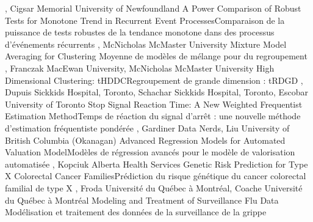 {
,  {Cigsar}
{Memorial University of Newfoundland}
}
{A Power Comparison of Robust Tests for Monotone Trend in Recurrent Event Processes}{Comparaison de la puissance de tests robustes de la tendance monotone dans des processus d’événements récurrents}
{\bubbleE \enspace \screenE}
{
,  {McNicholas}
{McMaster University}
}
{Mixture Model Averaging for Clustering }{Moyenne de modèles de mélange pour du regroupement}
{\bubbleE \enspace \screenE}
{
,  {Franczak}
{MacEwan University},  {McNicholas}
{McMaster University}
}
{High Dimensional Clustering: tHDDC}{Regroupement de grande dimension : tRDGD}
{\bubbleE \enspace \screenE}
{
,  {Dupuis}
{Sickkids Hospital, Toronto},  {Schachar}
{Sickkids Hospital, Toronto},  {Escobar}
{University of Toronto}
}
{Stop Signal Reaction Time: A New Weighted Frequentist Estimation Method}{Temps de réaction du signal d’arrêt : une nouvelle méthode d’estimation fréquentiste pondérée}
{\bubbleE \enspace \screenE}
{
,  {Gardiner}
{Data Nerds},  {Liu}
{University of British Columbia (Okanagan)}
}
{Advanced Regression Models for Automated Valuation Model}{Modèles de régression avancés pour le modèle de valorisation automatisée}
{\bubbleE \enspace \screenE}
{
,  {Kopciuk}
{Alberta Health Services}
}
{Genetic Risk Prediction for Type X Colorectal Cancer Families}{Prédiction du risque génétique du cancer colorectal familial de type X}
{\bubbleE \enspace \screenE}
{
,  {Froda}
{Université du Québec à Montréal},  {Coache}
{Université du Québec à Montréal}
}
{Modeling and Treatment of Surveillance Flu Data }{Modélisation et traitement des données de la surveillance de la grippe }
{\bubbleF \enspace \screenE}

